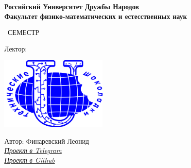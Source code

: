 \begin{titlepage}
	\clearpage\thispagestyle{empty}
	\centering
	
	\textbf{Российский Университет Дружбы Народов \\ Факультет физико-математических и естесственных наук}
	\vspace{33ex}
	
	{\Huge\textbf{\FullCourseNameFirstPart}}
	
	\SemesterNumber\ СЕМЕСТР  
	\vspace{1ex}
	
	Лектор: \textit{\LecturerInitials}

	\vspace{15mm}
	
	\includegraphics[width=0.4\textwidth]{images/logo.png}

	\begin{flushright}
		\noindent
		Автор: Финаревский Леонид
		\\
		\href{\TGLink}{\textit{Проект в Telegram}}
		\\
		\href{\GitLink}{\textit{Проект в Github}}
	\end{flushright}
	
	\vfill
	\CourseDate
	\pagebreak
\end{titlepage}
